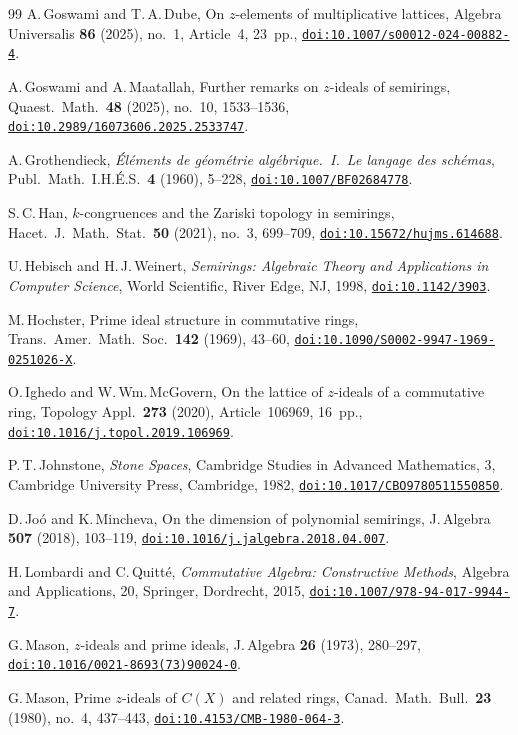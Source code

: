 \documentclass[11pt,leqno]{amsart}
\theoremstyle{plain}
\theoremstyle{definition}
\theoremstyle{remark}
\numberwithin{equation}{section}
\newcommand{\doi}[1]{\href{https://doi.org/#1}{\nolinkurl{doi:#1}}}
\begin{document}
\begin{thebibliography}{99}
A.\,Goswami and T.\,A.\,Dube,
On $z$-elements of multiplicative lattices,
Algebra Universalis \textbf{86} (2025), no.~1, Article~4, 23~pp.,
\doi{10.1007/s00012-024-00882-4}.

A.\,Goswami and A.\,Maatallah,
Further remarks on $z$-ideals of semirings,
Quaest.\ Math.\ \textbf{48} (2025), no.~10, 1533--1536,
\doi{10.2989/16073606.2025.2533747}.

A.\,Grothendieck,
\emph{\'El\'ements de g\'eom\'etrie alg\'ebrique.\
I.\ Le langage des sch\'emas},
Publ.\ Math.\ I.H.\'E.S.\ \textbf{4} (1960), 5--228,
\doi{10.1007/BF02684778}.

S.\,C.\,Han,
$k$-congruences and the Zariski topology in semirings,
Hacet.\ J.\ Math.\ Stat.\ \textbf{50} (2021), no.~3, 699--709,
\doi{10.15672/hujms.614688}.

U.\,Hebisch and H.\,J.\,Weinert,
\emph{Semirings: Algebraic Theory and Applications in Computer
Science},
World Scientific, River Edge, NJ, 1998,
\doi{10.1142/3903}.

M.\,Hochster,
Prime ideal structure in commutative rings,
Trans.\ Amer.\ Math.\ Soc.\ \textbf{142} (1969), 43--60,
\doi{10.1090/S0002-9947-1969-0251026-X}.

O.\,Ighedo and W.\,Wm.\,McGovern,
On the lattice of $z$-ideals of a commutative ring,
Topology Appl.\ \textbf{273} (2020), Article~106969, 16~pp.,
\doi{10.1016/j.topol.2019.106969}.

P.\,T.\,Johnstone,
\emph{Stone Spaces},
Cambridge Studies in Advanced Mathematics, 3,
Cambridge University Press, Cambridge, 1982,
\doi{10.1017/CBO9780511550850}.

D.\,Jo\'o and K.\,Mincheva,
On the dimension of polynomial semirings,
J.\,Algebra \textbf{507} (2018), 103--119,
\doi{10.1016/j.jalgebra.2018.04.007}.

H.\,Lombardi and C.\,Quitt\'e,
\emph{Commutative Algebra: Constructive Methods},
Algebra and Applications, 20,
Springer, Dordrecht, 2015,
\doi{10.1007/978-94-017-9944-7}.

G.\,Mason,
$z$-ideals and prime ideals,
J.\,Algebra \textbf{26} (1973), 280--297,
\doi{10.1016/0021-8693(73)90024-0}.

G.\,Mason,
Prime $z$-ideals of $C(X)$ and related rings,
Canad.\ Math.\ Bull.\ \textbf{23} (1980), no.~4, 437--443,
\doi{10.4153/CMB-1980-064-3}.


\end{thebibliography}
\end{document}
